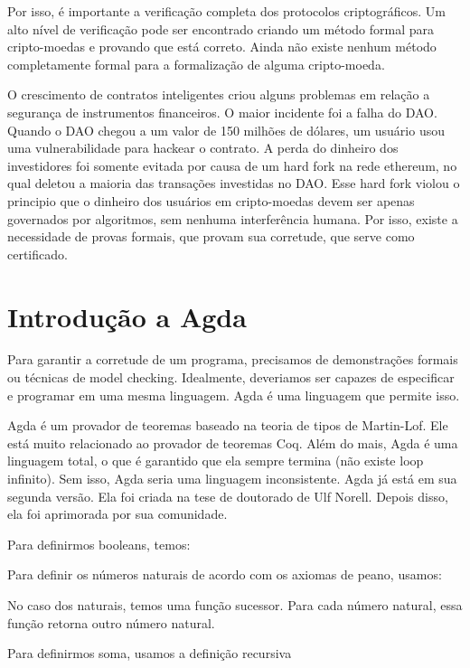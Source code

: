 \documentclass[12pt]{report}
\begin{document}
Por isso, é importante a verificação completa dos protocolos criptográficos. Um alto nível de verificação pode ser encontrado criando um método formal para cripto-moedas e provando que está correto. Ainda não existe nenhum método completamente formal para a formalização de alguma cripto-moeda.

O crescimento de contratos inteligentes criou alguns problemas em relação a segurança de instrumentos financeiros. O maior incidente foi a falha do DAO. Quando o DAO chegou a um valor de 150 milhões de dólares, um usuário usou uma vulnerabilidade para hackear o contrato. A perda do dinheiro dos investidores foi somente evitada por causa de um hard fork na rede ethereum, no qual deletou a maioria das transações investidas no DAO. Esse hard fork violou o principio que o dinheiro dos usuários em cripto-moedas devem ser apenas governados por algoritmos, sem nenhuma interferência humana. Por isso, existe a necessidade de provas formais, que provam sua corretude, que serve como certificado.

\section{Introdução a Agda}

Para garantir a corretude de um programa, precisamos de demonstrações formais ou técnicas de model checking. Idealmente, deveriamos ser capazes de especificar e programar em uma mesma linguagem. Agda é uma linguagem que permite isso.

Agda é um provador de teoremas baseado na teoria de tipos de Martin-Lof. Ele está muito relacionado ao provador de teoremas Coq. Além do mais, Agda é uma linguagem total, o que é garantido que ela sempre termina (não existe loop infinito). Sem isso, Agda seria uma linguagem inconsistente. Agda já está em sua segunda versão. Ela foi criada na tese de doutorado de Ulf Norell. Depois disso, ela foi aprimorada por sua comunidade.

Para definirmos booleans, temos:


Para definir os números naturais de acordo com os axiomas de peano, usamos:


No caso dos naturais, temos uma função sucessor. Para cada número natural, essa função retorna outro número natural.

Para definirmos soma, usamos a definição recursiva
\end{document}
